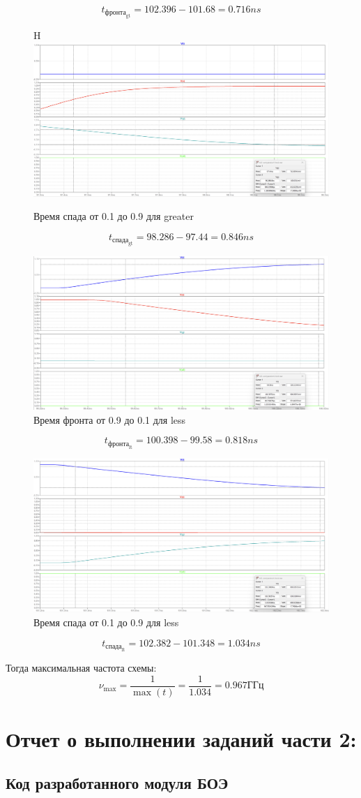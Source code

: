 \documentclass[12pt,onecolumn]{article}
\begin{document}
$$ t_{\text{фронта}_{\text{gt}}}=102.396 - 101.68 = 0.716 ns$$
\begin{figure}{H}
    \centering
    \includegraphics[width=\textwidth]{image/full-cmp-gt-freq-10.png}
    \caption{Время спада от 0.1 до 0.9 для greater}
\end{figure}
$$ t_{\text{спада}_{\text{gt}}}=98.286 - 97.44 = 0.846 ns$$
\begin{figure}[H]
    \centering
    \includegraphics[width=\textwidth]{image/full-cmp-lt-freq-01.png}
    \caption{Время фронта от 0.9 до 0.1 для less}
\end{figure}
$$ t_{\text{фронта}_{\text{lt}}}=100.398 - 99.58 = 0.818 ns$$
\begin{figure}[H]
    \centering
    \includegraphics[width=\textwidth]{image/full-cmp-lt-freq-10.png}
    \caption{Время спада от 0.1 до 0.9 для less}
\end{figure}
$$ t_{\text{спада}_{\text{lt}}}=102.382 - 101.348 = 1.034 ns$$

Тогда максимальная частота схемы:
$$ \nu_{\max} = \frac{1}{\max(t)}= \frac{1}{1.034} = 0.967\text{ГГц}$$

\section{Отчет о выполнении заданий части 2:}
\subsection{Код разработанного модуля БОЭ}
\end{document}
